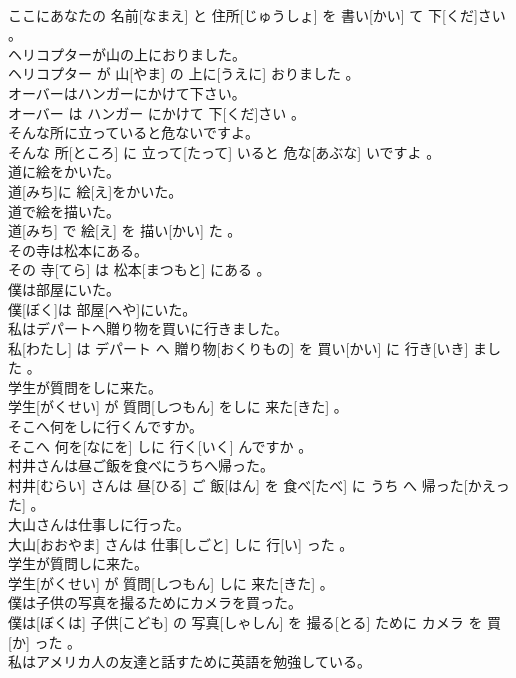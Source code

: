 \documentclass[8pt]{extreport}
\begin{document}
\begin{CJK}{UTF8}{min}
\\	ここにあなたの 名前[なまえ] と 住所[じゅうしょ] を 書い[かい] て 下[くだ]さい 。
\\	ヘリコプターが山の上におりました。	
\\	ヘリコプター が 山[やま] の 上に[うえに] おりました 。
\\	オーバーはハンガーにかけて下さい。	
\\	オーバー は ハンガー にかけて 下[くだ]さい 。
\\	そんな所に立っていると危ないですよ。	
\\	そんな 所[ところ] に 立って[たって] いると 危な[あぶな] いですよ 。
\\	道に絵をかいた。	
\\	道[みち]に 絵[え]をかいた。
\\	道で絵を描いた。	
\\	道[みち] で 絵[え] を 描い[かい] た 。
\\	その寺は松本にある。	
\\	その 寺[てら] は 松本[まつもと] にある 。
\\	僕は部屋にいた。	
\\	僕[ぼく]は 部屋[へや]にいた。
\\	私はデパートへ贈り物を買いに行きました。	
\\	私[わたし] は デパート へ 贈り物[おくりもの] を 買い[かい] に 行き[いき] ました 。
\\	学生が質問をしに来た。	
\\	学生[がくせい] が 質問[しつもん] をしに 来た[きた] 。
\\	そこへ何をしに行くんですか。	
\\	そこへ 何を[なにを] しに 行く[いく] んですか 。
\\	村井さんは昼ご飯を食べにうちへ帰った。	
\\	村井[むらい] さんは 昼[ひる] ご 飯[はん] を 食べ[たべ] に うち へ 帰った[かえった] 。
\\	大山さんは仕事しに行った。	
\\	大山[おおやま] さんは 仕事[しごと] しに 行[い] った 。
\\	学生が質問しに来た。	
\\	学生[がくせい] が 質問[しつもん] しに 来た[きた] 。
\\	僕は子供の写真を撮るためにカメラを買った。	
\\	僕は[ぼくは] 子供[こども] の 写真[しゃしん] を 撮る[とる] ために カメラ を 買[か] った 。
\\	私はアメリカ人の友達と話すために英語を勉強している。	

\end{CJK}
\end{document}
